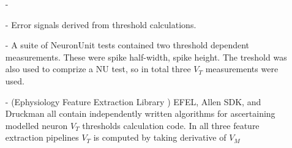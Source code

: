

\begin{itemize}
    \item[-]
    \item[-] Error signals derived from threshold calculations.
    \item[-] A suite of NeuronUnit tests contained two threshold dependent measurements. These were spike half-width, spike height. The treshold was also used to comprize a NU test, so in total three $V_{T}$ measurements were used.
    
    \item[-] (Ephysiology Feature Extraction Library \cite{}) EFEL, Allen SDK, and Druckman all contain independently written algorithms for ascertaining modelled neuron $V_{T}$ thresholds calculation code. In all three feature extraction pipelines $V_{T}$ is computed by taking derivative of $V_{M}$

\end{itemize}